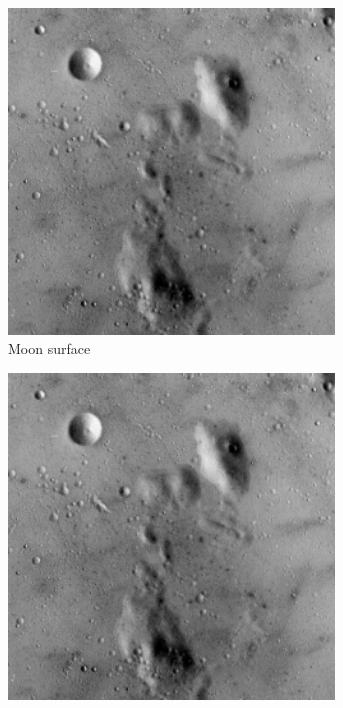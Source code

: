 \begin{figure}
\begin{subfigure}[b]{.23\textwidth}
  \centering
  \includegraphics[width=0.95\textwidth]{figures/test-images/original/moonsurface}
  \caption{Moon surface}
  \label{fig:test-images-moonsurface}
\end{subfigure}
\begin{subfigure}[b]{.23\textwidth}
  \centering
  \includegraphics[width=0.95\textwidth]{figures/test-images/truncate1/moonsurface}

\end{subfigure}
\end{figure}
